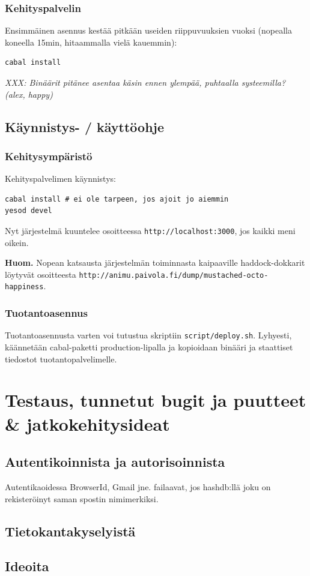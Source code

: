 \documentclass[a4paper,12pt]{report}
\begin{document}
\subsection{Kehityspalvelin}

Ensimmäinen asennus kestää pitkään useiden riippuvuuksien vuoksi (nopealla
koneella 15min, hitaammalla vielä kauemmin):
\begin{verbatim}
cabal install
\end{verbatim}

\textit{XXX: Binäärit pitänee asentaa käsin ennen ylempää, puhtaalla systeemilla?
(alex, happy)}

\section{Käynnistys- / käyttöohje}

\subsection{Kehitysympäristö}

Kehityspalvelimen käynnistys:
\begin{verbatim}
cabal install # ei ole tarpeen, jos ajoit jo aiemmin
yesod devel
\end{verbatim}

Nyt järjestelmä kuuntelee osoitteessa \texttt{http://localhost:3000}, jos kaikki
meni oikein.

\textbf{Huom.} Nopean katsausta järjestelmän toiminnasta kaipaaville
haddock-dokkarit löytyvät osoitteesta
\texttt{http://animu.paivola.fi/dump/mustached-octo-happiness}.

\subsection{Tuotantoasennus}

Tuotantoasennusta varten voi tutustua skriptiin \texttt{script/deploy.sh}.
Lyhyesti, käännetään cabal-paketti production-lipalla ja kopioidaan binääri ja
staattiset tiedostot tuotantopalvelimelle.

\chapter{Testaus, tunnetut bugit ja puutteet \& jatkokehitysideat}

\section*{Autentikoinnista ja autorisoinnista}

Autentikaoidessa BrowserId, Gmail jne. failaavat, jos hashdb:llä joku on
rekisteröinyt saman spostin nimimerkiksi.

\section*{Tietokantakyselyistä}

\section*{Ideoita}


\end{document}

